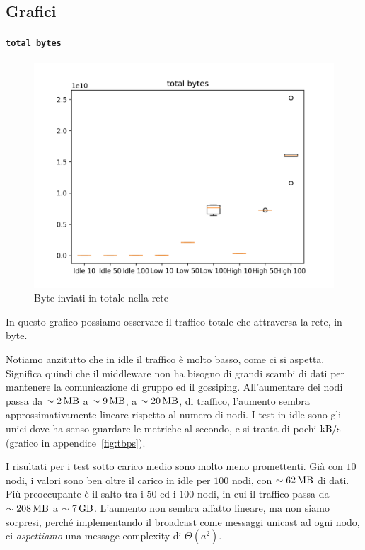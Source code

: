 \documentclass[12pt, a4paper]{article}
\begin{document}
\subsection{Grafici}

\paragraph{\lstinline{total bytes}}

\begin{figure}[H]
    \includegraphics[width=\linewidth, keepaspectratio]{graphs/total bytes.png}
    \caption{Byte inviati in totale nella rete}
    \label{fig:tb}
\end{figure}

In questo grafico possiamo osservare il traffico totale che attraversa la rete, in byte.

Notiamo anzitutto che in idle il traffico è molto basso, come ci si aspetta. Significa quindi che il middleware non ha bisogno di grandi scambi di dati per mantenere la comunicazione di gruppo ed il gossiping.
All'aumentare dei nodi passa da $\sim\qty{2}{\mega\byte}$ a $\sim\qty{9}{\mega\byte}$, a $\sim\qty{20}{\mega\byte}$, di traffico, l'aumento sembra approssimativamente lineare rispetto al numero di nodi.
I test in idle sono gli unici dove ha senso guardare le metriche al secondo, e si tratta di pochi $\unit{\kilo\byte/\second}$ (grafico in appendice~\ref{fig:tbps}).

I risultati per i test sotto carico medio sono molto meno promettenti. Già con $10$ nodi, i valori sono ben oltre il carico in idle per $100$ nodi, con $\sim\qty{62}{\mega\byte}$ di dati.\\
Più preoccupante è il salto tra i $50$ ed i $100$ nodi, in cui il traffico passa da $\sim\qty{208}{\mega\byte}$ a $\sim\qty{7}{\giga\byte}$. L'aumento non sembra affatto lineare, ma non siamo sorpresi, perché implementando il broadcast come messaggi unicast ad ogni nodo, ci \emph{aspettiamo} una message complexity di $\Theta(a^2)$.
\end{document}
